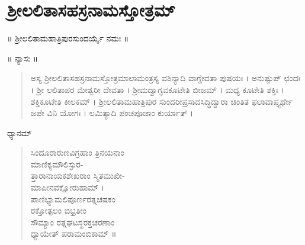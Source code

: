 
\chapter*{ಶ್ರೀಲಲಿತಾಸಹಸ್ರನಾಮಸ್ತೋತ್ರಮ್​}

\begin{center}
॥ ಶ್ರೀಲಲಿತಾಮಹಾತ್ರಿಪುರಸುಂದರ್ಯೈ ನಮಃ ॥
\end{center}

\begin{center}
॥ ನ್ಯಾಸಃ ॥
\end{center}

\begin{verse}
ಅಸ್ಯ ಶ್ರೀಲಲಿತಾಸಹಸ್ರನಾಮಸ್ತೋತ್ರಮಾಲಾಮಂತ್ರಸ್ಯ ವಶಿನ್ಯಾದಿ ವಾಗ್ದೇವತಾ ಪುಷಯಃ । ಅನುಷ್ಟುಪ್ ಛಂದಃ । ಶ್ರೀ ಲಲಿತಾಪರ ಮೇಶ್ವರೀ ದೇವತಾ । ಶ್ರೀಮದ್ವಾಗ್ಭವಕೂಟೇತಿ ಬೀಜಮ್ । ಮಧ್ಯ ಕೂಟೇತಿ ಶಕ್ತಿಃ । ಶಕ್ತಿಕೂಟೇತಿ ಕೀಲಕಮ್ । ಶ್ರೀಲಲಿತಾಮಹಾತ್ರಿಪುರ ಸುಂದರೀಪ್ರಸಾದಸಿದ್ಧಿದ್ವಾರಾ ಚಿಂತಿತ ಫಲಾವಾಪ್ತ್ಯರ್ಥೇ ಜಪೇ ವಿನಿ ಯೋಗಃ । ಲಮಿತ್ಯಾದಿ ಪಂಚಪೂಜಾಂ ಕುರ್ಯಾತ್ ।
\end{verse}

\begin{center}
ಧ್ಯಾನಮ್​
\end{center}

\begin{verse}
ಸಿಂದೂರಾರುಣವಿಗ್ರಹಾಂ ತ್ರಿನಯನಾಂ\\ಮಾಣಿಕ್ಯಮೌಲಿಸ್ಫುರ-\\ತ್ತಾರಾನಾಯಕಶೇಖರಾಂ ಸ್ಮಿತಮುಖೀ-\\ಮಾಪೀನವಕ್ಷೋರುಹಾಮ್ ।\\ಪಾಣಿಭ್ಯಾಮಲಿಪೂರ್ಣರತ್ನಚಷಕಂ\\ರಕ್ತೋತ್ಪಲಂ ಬಿಭ್ರತೀಂ\\ಸೌಮ್ಯಾಂ ರತ್ನಘಟಸ್ಥರಕ್ತಚರಣಾಂ\\ಧ್ಯಾಯೇತ್ ಪರಾಮಂಬಿಕಾಮ್ ॥
\end{verse}

